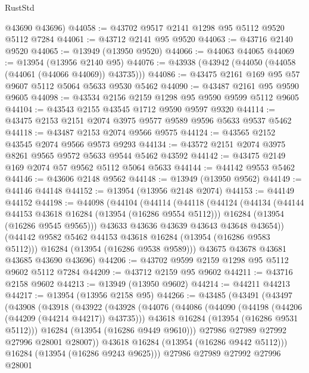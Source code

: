 \begin{lexlean}{RustStd}
\begin{coremodule}
      @43690
      @43696)
@44058 := @43702 @9517 @2141 @1298 @95 @5112 @9520 @5112 @7284
@44061 := @43712 @2141 @95 @9520
@44063 := @43716 @2140 @9520
@44065 := @13949 (@13950 @9520)
@44066 := @44063 @44065
@44069 := @13954 (@13956 @2140 @95)
@44076 := @43938 (@43942 (@44050 (@44058 (@44061 (@44066 @44069)) @43735)))
@44086 := @43475 @2161 @169 @95 @57 @9607 @5112 @5064 @5633 @9530 @5462
@44090 := @43487 @2161 @95 @9590 @9605
@44098 := @43534 @2156 @2159 @1298 @95 @9590 @9599 @5112 @9605
@44104 := @43543 @2155 @43545 @1712 @9590 @9597 @9320
@44114 := @43475 @2153 @2151 @2074 @3975 @9577 @9589 @9596 @5633 @9537 @5462
@44118 := @43487 @2153 @2074 @9566 @9575
@44124 := @43565 @2152 @43545 @2074 @9566 @9573 @9293
@44134 := @43572 @2151 @2074 @3975 @8261 @9565 @9572 @5633 @9544 @5462 @43592
@44142 := @43475 @2149 @169 @2074 @57 @9562 @5112 @5064 @5633
@44144 := @44142 @9553 @5462
@44146 := @43606 @2148 @9562
@44148 := @13949 (@13950 @9562)
@44149 := @44146 @44148
@44152 := @13954 (@13956 @2148 @2074)
@44153 := @44149 @44152
@44198 := @44098
    (@44104
      (@44114
        (@44118
          (@44124
            (@44134
              (@44144 @44153 @43618 @16284 (@13954 (@16286 @9554 @5112)))
              @16284
              (@13954 (@16286 @9545 @9565)))
            @43633
            @43636
            @43639
            @43643
            @43648
            @43654))
        (@44142 @9582 @5462 @44153 @43618 @16284 (@13954 (@16286 @9583 @5112)))
        @16284
        (@13954 (@16286 @9538 @9589)))
      @43675
      @43678
      @43681
      @43685
      @43690
      @43696)
@44206 := @43702 @9599 @2159 @1298 @95 @5112 @9602 @5112 @7284
@44209 := @43712 @2159 @95 @9602
@44211 := @43716 @2158 @9602
@44213 := @13949 (@13950 @9602)
@44214 := @44211 @44213
@44217 := @13954 (@13956 @2158 @95)
@44266 := @43485
    (@43491
      (@43497
        (@43908
          (@43918
            (@43922
              (@43928
                (@44076
                  (@44086
                    (@44090 (@44198 (@44206 (@44209 (@44214 @44217)) @43735)))
                    @43618
                    @16284
                    (@13954 (@16286 @9531 @5112)))
                  @16284
                  (@13954 (@16286 @9449 @9610)))
                @27986
                @27989
                @27992
                @27996
                @28001
                @28007))
            @43618
            @16284
            (@13954 (@16286 @9442 @5112)))
          @16284
          (@13954 (@16286 @9243 @9625)))
        @27986
        @27989
        @27992
        @27996
        @28001

\end{coremodule}
\end{lexlean}
